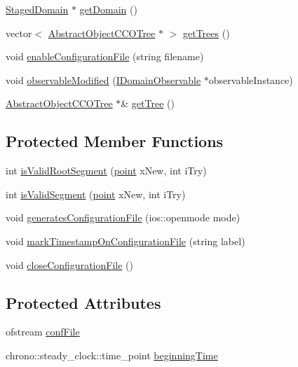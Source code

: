 \begin{DoxyCompactItemize}
\item 
\hyperlink{class_staged_domain}{Staged\+Domain} $\ast$ \hyperlink{class_staged_f_r_r_o_tree_generator_adac14b11b09b21df02d635ed124216a7}{get\+Domain} ()
\item 
vector$<$ \hyperlink{class_abstract_object_c_c_o_tree}{Abstract\+Object\+C\+C\+O\+Tree} $\ast$ $>$ \hyperlink{class_staged_f_r_r_o_tree_generator_a3aeb9dd5215d1103fe2c686c86967f54}{get\+Trees} ()
\item 
void \hyperlink{class_staged_f_r_r_o_tree_generator_a878038a908e5a3ac9433f570ebd8b4ae}{enable\+Configuration\+File} (string filename)
\item 
void \hyperlink{class_staged_f_r_r_o_tree_generator_a01a80f2720de4fe42b47dd9eb98a25bd}{observable\+Modified} (\hyperlink{class_i_domain_observable}{I\+Domain\+Observable} $\ast$observable\+Instance)
\item 
\hyperlink{class_abstract_object_c_c_o_tree}{Abstract\+Object\+C\+C\+O\+Tree} $\ast$\& \hyperlink{class_staged_f_r_r_o_tree_generator_a2332bdf2a9edb5f4739e7379536eb632}{get\+Tree} ()
\end{DoxyCompactItemize}
\subsection*{Protected Member Functions}
\begin{DoxyCompactItemize}
\item 
int \hyperlink{class_staged_f_r_r_o_tree_generator_aa9672ad3756b4c4bddc91d8e59481f38}{is\+Valid\+Root\+Segment} (\hyperlink{structpoint}{point} x\+New, int i\+Try)
\item 
int \hyperlink{class_staged_f_r_r_o_tree_generator_ae357cc09a7e74d802d3155f096cbb21f}{is\+Valid\+Segment} (\hyperlink{structpoint}{point} x\+New, int i\+Try)
\item 
void \hyperlink{class_staged_f_r_r_o_tree_generator_a7ed8117f7d652c426e28d0444b87378c}{generates\+Configuration\+File} (ios\+::openmode mode)
\item 
void \hyperlink{class_staged_f_r_r_o_tree_generator_ad3f04c8a35843fed669191118d4498d6}{mark\+Timestamp\+On\+Configuration\+File} (string label)
\item 
void \hyperlink{class_staged_f_r_r_o_tree_generator_ab431406dedabb57e0ea6274797aa7dd7}{close\+Configuration\+File} ()
\end{DoxyCompactItemize}
\subsection*{Protected Attributes}
\begin{DoxyCompactItemize}
\item 
ofstream \hyperlink{class_staged_f_r_r_o_tree_generator_a0f8c6801bbbd5968719911f799d66223}{conf\+File}
\item 
chrono\+::steady\+\_\+clock\+::time\+\_\+point \hyperlink{class_staged_f_r_r_o_tree_generator_abe0c3ffd62ab2f9915a6e09c9c31733b}{beginning\+Time}
\end{DoxyCompactItemize}
